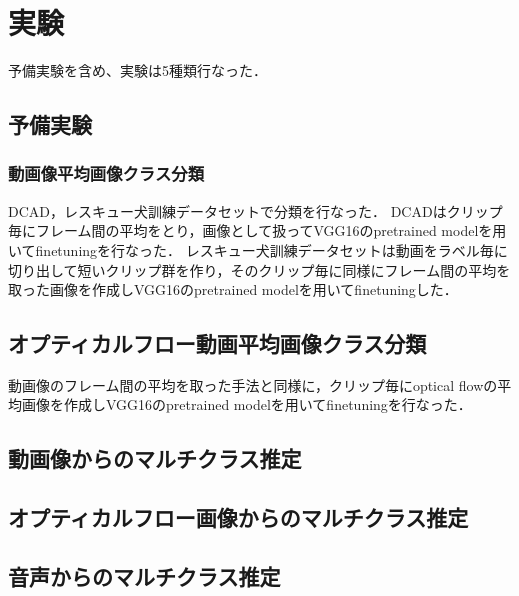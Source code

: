 \chapter{実験}
予備実験を含め、実験は5種類行なった．

\section{予備実験}
\subsection{動画像平均画像クラス分類}
DCAD，レスキュー犬訓練データセットで分類を行なった．
DCADはクリップ毎にフレーム間の平均をとり，画像として扱ってVGG16のpretrained modelを用いてfinetuningを行なった．
レスキュー犬訓練データセットは動画をラベル毎に切り出して短いクリップ群を作り，そのクリップ毎に同様にフレーム間の平均を取った画像を作成しVGG16のpretrained modelを用いてfinetuningした．

\section{オプティカルフロー動画平均画像クラス分類}
動画像のフレーム間の平均を取った手法と同様に，クリップ毎にoptical flowの平均画像を作成しVGG16のpretrained modelを用いてfinetuningを行なった．

\section{動画像からのマルチクラス推定}
\section{オプティカルフロー画像からのマルチクラス推定}
\section{音声からのマルチクラス推定}
